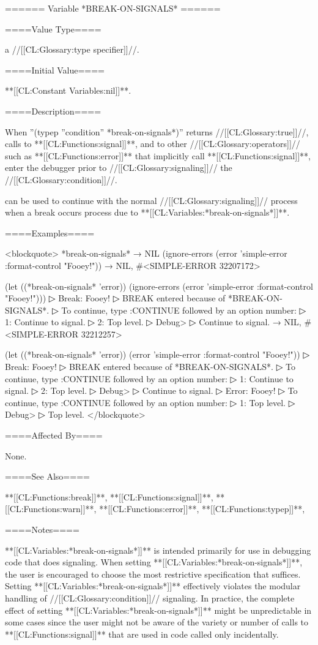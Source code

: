 ====== Variable *BREAK-ON-SIGNALS* ======

====Value Type====

a //[[CL:Glossary:type specifier]]//.

====Initial Value====

**[[CL:Constant Variables:nil]]**.

====Description====

When ''(typep ''condition'' *break-on-signals*)'' returns //[[CL:Glossary:true]]//, calls to **[[CL:Functions:signal]]**, and to other //[[CL:Glossary:operators]]// such as **[[CL:Functions:error]]** that implicitly call **[[CL:Functions:signal]]**, enter the debugger prior to //[[CL:Glossary:signaling]]// the //[[CL:Glossary:condition]]//.

 can be used to continue with the normal //[[CL:Glossary:signaling]]// process when a break occurs process due to **[[CL:Variables:*break-on-signals*]]**.

====Examples====

<blockquote> *break-on-signals* → NIL (ignore-errors (error 'simple-error :format-control "Fooey!")) → NIL, #<SIMPLE-ERROR 32207172>

(let ((*break-on-signals* 'error)) (ignore-errors (error 'simple-error :format-control "Fooey!")))
▷ Break: Fooey!
▷ BREAK entered because of *BREAK-ON-SIGNALS*.
▷ To continue, type :CONTINUE followed by an option number:
▷ 1: Continue to signal.
▷ 2: Top level.
▷ Debug> 
▷ Continue to signal. → NIL, #<SIMPLE-ERROR 32212257>

(let ((*break-on-signals* 'error)) (error 'simple-error :format-control "Fooey!"))
▷ Break: Fooey!
▷ BREAK entered because of *BREAK-ON-SIGNALS*.
▷ To continue, type :CONTINUE followed by an option number:
▷ 1: Continue to signal.
▷ 2: Top level.
▷ Debug> 
▷ Continue to signal.
▷ Error: Fooey!
▷ To continue, type :CONTINUE followed by an option number:
▷ 1: Top level.
▷ Debug> 
▷ Top level. </blockquote>

====Affected By====

None.

====See Also====

**[[CL:Functions:break]]**, **[[CL:Functions:signal]]**, **[[CL:Functions:warn]]**, **[[CL:Functions:error]]**, **[[CL:Functions:typep]]**, {\secref\ConditionSystemConcepts}

====Notes====

**[[CL:Variables:*break-on-signals*]]** is intended primarily for use in debugging code that does signaling. When setting **[[CL:Variables:*break-on-signals*]]**, the user is encouraged to choose the most restrictive specification that suffices. Setting **[[CL:Variables:*break-on-signals*]]** effectively violates the modular handling of //[[CL:Glossary:condition]]// signaling. In practice, the complete effect of setting **[[CL:Variables:*break-on-signals*]]** might be unpredictable in some cases since the user might not be aware of the variety or number of calls to **[[CL:Functions:signal]]** that are used in code called only incidentally.

